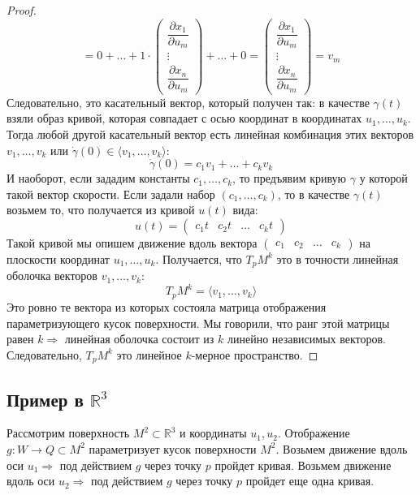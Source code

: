 \documentclass[12pt]{article}
\newcommand{\MR}{\mathbb{R}}
\theoremstyle{definition}
\begin{document}
\begin{proof}
$$ 		= 0 + \dotsc +  1{\cdot} \!\! 
		\begin{pmatrix}
			\dfrac{\partial x_1}{\partial u_m}\\
			\vdots\\
			\dfrac{\partial x_n}{\partial u_m} 
		\end{pmatrix} + \dotsc + 0 = 
		\begin{pmatrix}
			\dfrac{\partial x_1}{\partial u_m}\\
			\vdots\\
			\dfrac{\partial x_n}{\partial u_m} 
		\end{pmatrix}
 	= v_m
	 $$
	 Следовательно, это касательный вектор, который получен так: в качестве $\gamma(t)$ взяли образ кривой, которая совпадает с осью координат в координатах $u_1,\dotsc, u_k$. Тогда любой другой касательный вектор есть линейная комбинация этих векторов $v_1, \dotsc, v_k$ или $\dot{\gamma}(0) \in \langle v_1,\dotsc,v_k \rangle$:
	 $$
	 	\dot{\gamma}(0) = c_1v_1 + \dotsc + c_kv_k
	 $$
	 И наоборот, если зададим константы $c_1,\dotsc, c_k$, то предъявим кривую $\gamma$ у которой такой вектор скорости. Если задали набор $(c_1, \dotsc, c_k)$, то в качестве $\gamma(t)$ возьмем то, что получается из кривой $u(t)$ вида:
	 $$
	 	 u(t) = \begin{pmatrix}
	 	 	c_1 t & c_2 t& \dotsc & c_k t
	 	 \end{pmatrix}
	 $$
	 Такой кривой мы опишем движение вдоль вектора $\begin{pmatrix}
	 	c_1 & c_2 & \dotsc & c_k
	 \end{pmatrix}$ на плоскости координат $u_1, \dotsc, u_k$.
	 Получается, что $T_p M^k$ это в точности линейная оболочка векторов $v_1 ,\dotsc, v_k$:
	 $$
	 	T_p M^k = \langle v_1, \dotsc , v_k \rangle
	 $$
	 Это ровно те вектора из которых состояла матрица отображения параметризующего кусок поверхности. Мы говорили, что ранг этой матрицы равен $k \Rightarrow$ линейная оболочка состоит из $k$ линейно независимых векторов. Следовательно, $T_p M^k$ это линейное $k$-мерное пространство.
\end{proof}
\subsection*{Пример в $\MR^3$}
Рассмотрим поверхность $M^2 \subset \MR^3$ и координаты $u_1, u_2$. Отображение $g \colon W \to Q\subset M^2$ параметризует кусок поверхности $M^2$. Возьмем движение вдоль оси $u_1 \Rightarrow$ под действием $g$ через точку $p$ пройдет кривая. Возьмем движение вдоль оси $u_2 \Rightarrow$ под действием $g$ через точку $p$ пройдет еще одна кривая. 
\end{document}
